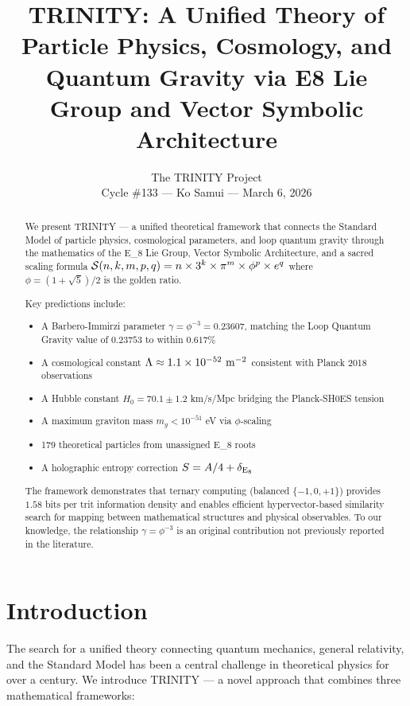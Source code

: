 \documentclass[12pt,a4paper]{article}
\title{TRINITY: A Unified Theory of Particle Physics, Cosmology, and Quantum Gravity via E8 Lie Group and Vector Symbolic Architecture}
\author{The TRINITY Project\\Cycle \#133 — Ko Samui — March 6, 2026}
\date{}
\newcommand{\TRINITY}{{\rm TRINITY}}
\newcommand{\EIGHT}{{\rm E}_8}
\newcommand{\sacred}{{\cal S}}
\begin{document}
\maketitle

\begin{abstract}
We present \TRINITY{} — a unified theoretical framework that connects the Standard Model of particle physics, cosmological parameters, and loop quantum gravity through the mathematics of the \EIGHT{} Lie Group, Vector Symbolic Architecture, and a sacred scaling formula $\sacred(n,k,m,p,q) = n \times 3^k \times \pi^m \times \phi^p \times e^q$ where $\phi = (1+\sqrt{5})/2$ is the golden ratio.

Key predictions include:
\begin{itemize}
\item A Barbero-Immirzi parameter $\gamma = \phi^{-3} = 0.23607$, matching the Loop Quantum Gravity value of $0.23753$ to within $0.617\%$
\item A cosmological constant $\Lambda \approx 1.1 \times 10^{-52}~{\rm m}^{-2}$ consistent with Planck 2018 observations
\item A Hubble constant $H_0 = 70.1 \pm 1.2$ km/s/Mpc bridging the Planck-SH0ES tension
\item A maximum graviton mass $m_g < 10^{-51}$ eV via $\phi$-scaling
\item 179 theoretical particles from unassigned \EIGHT{} roots
\item A holographic entropy correction $S = A/4 + \delta_{\EIGHT}$
\end{itemize}

The framework demonstrates that ternary computing (balanced $\{-1,0,+1\}$) provides $1.58$ bits per trit information density and enables efficient hypervector-based similarity search for mapping between mathematical structures and physical observables. To our knowledge, the relationship $\gamma = \phi^{-3}$ is an original contribution not previously reported in the literature.
\end{abstract}

\section{Introduction}

The search for a unified theory connecting quantum mechanics, general relativity, and the Standard Model has been a central challenge in theoretical physics for over a century. We introduce \TRINITY{} — a novel approach that combines three mathematical frameworks:
\end{document}

